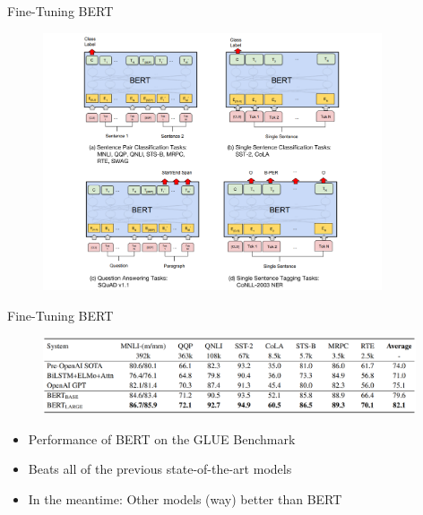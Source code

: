 
\begin{frame}{Fine-Tuning BERT}
	\begin{figure}
	\centering
		\includegraphics[width = 10cm]{figure/bert-finetune.png}\\ 
	\end{figure}
\end{frame}



\begin{frame}{Fine-Tuning BERT}

\vspace{1.5cm}

	\begin{figure}
	\centering
		\includegraphics[width = 11cm]{figure/bert-sota.png}\\ 
	\end{figure}
\begin{itemize}
	\item Performance of BERT on the GLUE Benchmark 
	\item Beats all of the previous state-of-the-art models
	\item In the meantime: Other models (way) better than BERT
\end{itemize}

\end{frame}

